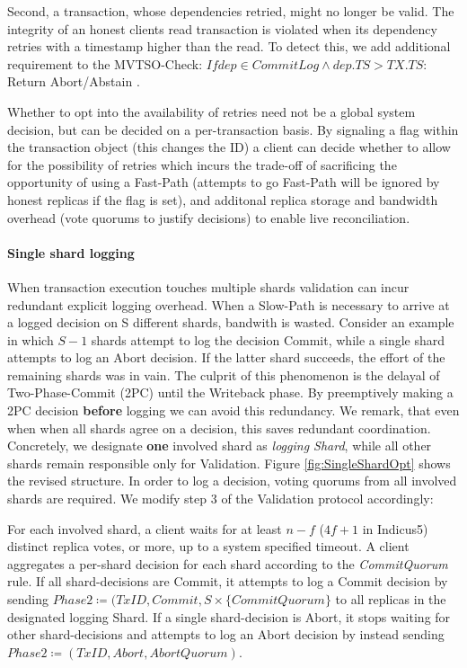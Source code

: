 Second, a transaction, whose dependencies retried, might no longer be valid. The integrity of an honest clients read transaction is violated when its dependency retries with a timestamp higher than the read. To detect this, we add additional requirement to the MVTSO-Check: $If dep \in CommitLog \land dep.TS > TX.TS:$ Return Abort/Abstain .



Whether to opt into the availability of retries need not be a global system decision, but can be decided on a per-transaction basis. By signaling a flag within the transaction object (this changes the ID) a client can decide whether to allow for the possibility of retries which incurs the trade-off of sacrificing the opportunity of using a Fast-Path (attempts to go Fast-Path will be ignored by honest replicas if the flag is set), and additonal replica storage and bandwidth overhead (vote quorums to justify decisions) to enable live reconciliation.



\paragraph{Single shard logging}

When transaction execution touches multiple shards validation can incur redundant explicit logging overhead. When a Slow-Path is necessary to arrive at a logged decision on S different shards, bandwith is wasted. Consider an example in which $S-1$ shards attempt to log the decision Commit, while a single shard attempts to log an Abort decision. If the latter shard succeeds, the effort of the remaining shards was in vain. 
The culprit of this phenomenon is the delayal of Two-Phase-Commit (2PC) until the Writeback phase. By preemptively making a 2PC decision \textbf{before} logging we can avoid this redundancy. We remark, that even when when all shards agree on a decision, this saves redundant coordination.
Concretely, we designate \textbf{one} involved shard as \textit{logging Shard}, while all other shards remain responsible only for Validation. Figure \ref{fig:SingleShardOpt} shows the revised structure. In order to log a decision, voting quorums from all involved shards are required. We modify step 3 of the Validation protocol accordingly:

For each involved shard, a client waits for at least $n-f$ ($4f+1$ in Indicus5) distinct replica votes, or more, up to a system specified timeout. A client aggregates a per-shard decision for each shard according to the \textit{CommitQuorum} rule. If all shard-decisions are Commit, it attempts to log a Commit decision by sending $Phase2 \coloneqq (TxID, Commit, S \times \{CommitQuorum\}$ to all replicas in the designated logging Shard. If a single shard-decision is Abort, it stops waiting for other shard-decisions and attempts to log an Abort decision by instead sending $Phase2 \coloneqq (TxID, Abort, AbortQuorum)$. 

